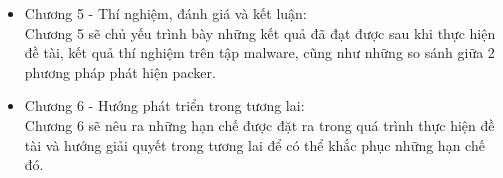 \begin{itemize}[leftmargin=*]
\item{Chương 5 - Thí nghiệm, đánh giá và kết luận:\\
\hspace*{0.5cm}Chương 5 sẽ chủ yếu trình bày những kết quả đã đạt được sau khi thực hiện đề tài, kết quả thí nghiệm trên tập malware, cũng như những so sánh giữa 2 phương pháp phát hiện packer.\\}
\item{Chương 6 - Hướng phát triển trong tương lai:\\
\hspace*{0.5cm}Chương 6 sẽ nêu ra những hạn chế được đặt ra trong quá trình thực hiện đề tài và hướng giải quyết trong tương lai để có thể khắc phục những hạn chế đó.}
\end{itemize}
